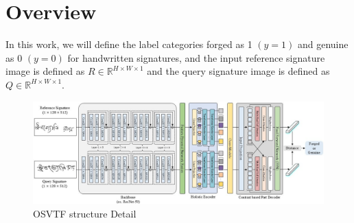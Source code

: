 \section{Overview}
In this work, we will define the label categories forged as 1 $(y=1)$ and genuine as 0 $(y=0)$ for handwritten signatures, and the input reference signature image is defined as $R \in \mathbb{R}^{H\times W\times 1}$ and the query signature image is defined as $Q \in \mathbb{R}^{H\times W\times 1}$.

\begin{figure}[htbp]
  \begin{center}
      \includegraphics[scale=0.46]{figure/osvtf.jpg}
  \end{center}
  \caption{OSVTF structure Detail}
  \label{fig:osvtf}
\end{figure}

